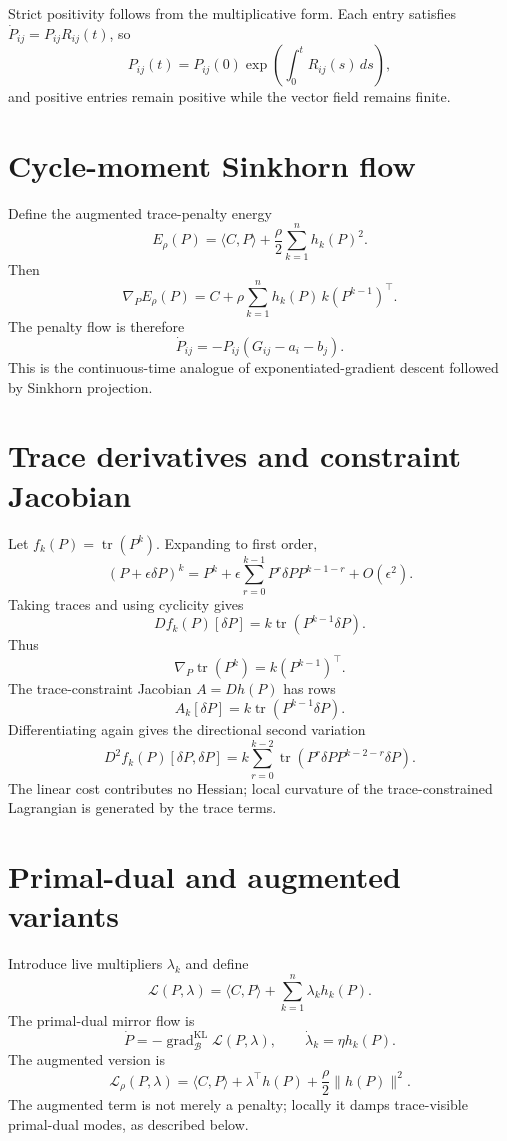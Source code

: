 \documentclass[11pt]{article}
\newcommand{\B}{\mathcal B}
\newcommand{\tr}{\operatorname{tr}}
\newcommand{\grad}{\operatorname{grad}}
\begin{document}
Strict positivity follows from the multiplicative form. Each entry satisfies $\dot P_{ij}=P_{ij}R_{ij}(t)$, so
\[
    P_{ij}(t)=P_{ij}(0)\exp\left(\int_0^tR_{ij}(s)\,ds\right),
\]
and positive entries remain positive while the vector field remains finite.

\section{Cycle-moment Sinkhorn flow}

Define the augmented trace-penalty energy
\[
    E_\rho(P)=\langle C,P\rangle+\frac{\rho}{2}\sum_{k=1}^nh_k(P)^2.
\]
Then
\[
    \nabla_P E_\rho(P)=C+\rho\sum_{k=1}^n h_k(P)\,k(P^{k-1})^\top.
\]
The penalty flow is therefore
\[
    \dot P_{ij}=-P_{ij}(G_{ij}-a_i-b_j).
\]
This is the continuous-time analogue of exponentiated-gradient descent followed by Sinkhorn projection.

\section{Trace derivatives and constraint Jacobian}

Let $f_k(P)=\tr(P^k)$. Expanding to first order,
\[
    (P+\epsilon\delta P)^k=P^k+\epsilon\sum_{r=0}^{k-1}P^r\delta P P^{k-1-r}+O(\epsilon^2).
\]
Taking traces and using cyclicity gives
\[
    Df_k(P)[\delta P]=k\tr(P^{k-1}\delta P).
\]
Thus
\[
    \nabla_P\tr(P^k)=k(P^{k-1})^\top.
\]
The trace-constraint Jacobian $A=Dh(P)$ has rows
\[
    A_k[\delta P]=k\tr(P^{k-1}\delta P).
\]
Differentiating again gives the directional second variation
\[
    D^2f_k(P)[\delta P,\delta P]
    =k\sum_{r=0}^{k-2}\tr(P^r\delta P P^{k-2-r}\delta P).
\]
The linear cost contributes no Hessian; local curvature of the trace-constrained Lagrangian is generated by the trace terms.

\section{Primal-dual and augmented variants}

Introduce live multipliers $\lambda_k$ and define
\[
    \mathcal L(P,\lambda)=\langle C,P\rangle+\sum_{k=1}^n\lambda_kh_k(P).
\]
The primal-dual mirror flow is
\[
    \dot P=-\grad^{\mathrm{KL}}_\B\mathcal L(P,\lambda),\qquad \dot\lambda_k=\eta h_k(P).
\]
The augmented version is
\[
    \mathcal L_\rho(P,\lambda)=\langle C,P\rangle+\lambda^\top h(P)+\frac{\rho}{2}\|h(P)\|^2.
\]
The augmented term is not merely a penalty; locally it damps trace-visible primal-dual modes, as described below.
\end{document}
